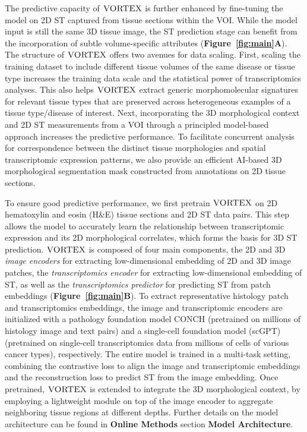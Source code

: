 The predictive capacity of $\textsc{VORTEX}$ is further enhanced by fine-tuning the model on 2D ST captured from tissue sections within the VOI. While the model input is still the same 3D tissue image, the ST prediction stage can benefit from the incorporation of subtle volume-specific attributes (\textbf{Figure~\ref{fig:main}A}). 
The structure of $\textsc{VORTEX}$ offers two avenues for data scaling. First, scaling the training dataset to include different tissue volumes of the same disease or tissue type increases the training data scale and the statistical power of transcriptomics analyses\cite{stuart2019comprehensive, korsunsky2019fast}. This also helps $\textsc{VORTEX}$ extract generic morphomolecular signatures for relevant tissue types that are preserved across heterogeneous examples of a tissue type/disease of interest. Next, incorporating the 3D morphological context and 2D ST measurements from a VOI through a principled model-based approach increases the predictive performance. To facilitate concurrent analysis for correspondence between the distinct tissue morphologies and spatial transcriptomic expression patterns, we also provide an efficient AI-based 3D morphological segmentation mask constructed from annotations on 2D tissue sections\cite{kirillov2023segment}.
 
To ensure good predictive performance, we first pretrain $\textsc{VORTEX}$ on 2D hematoxylin and eosin (H\&E) tissue sections and 2D ST data pairs. This step allows the model to accurately learn the relationship between transcriptomic expression and its 2D morphological correlates, which forms the basis for 3D ST prediction. $\textsc{VORTEX}$ is composed of four main components, the 2D and 3D \textit{image encoders} for extracting low-dimensional embedding of 2D and 3D image patches, the \textit{transcriptomics encoder} for extracting low-dimensional embedding of ST, as well as the \textit{transcriptomics predictor} for predicting ST from patch embeddings (\textbf{Figure~\ref{fig:main}B}).
To extract representative histology patch and transcriptomics embeddings, the image and transcriptomic encoders are initialized with a pathology foundation model CONCH\cite{lu2024visual} (pretrained on millions of histology image and text pairs) and a single-cell foundation model (scGPT)\cite{cui2024scgpt} (pretrained on single-cell transcriptomics data from millions of cells of various cancer types), respectively. The entire model is trained in a multi-task setting, combining the contrastive loss to align the image and transcriptomic embeddings and the reconstruction loss to predict ST from the image embedding\cite{yu2022coca}.
Once pretrained, $\textsc{VORTEX}$ is extended to integrate the 3D morphological context, by employing a lightweight module on top of the image encoder to aggregate neighboring tissue regions at different depths. Further details on the model architecture can be found in \textbf{Online Methods} section \textbf{Model Architecture}.

